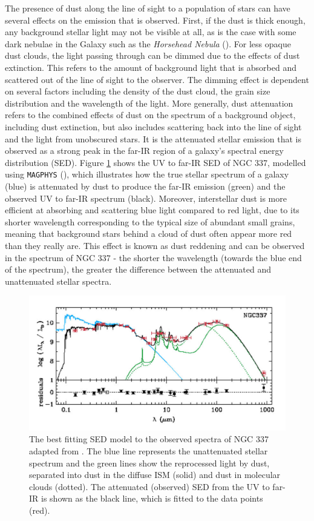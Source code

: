 The presence of dust along the line of sight to a population of stars can have several effects on the emission that is observed. First, if the dust is thick enough, any background stellar light may not be visible at all, as is the case with some dark nebulae in the Galaxy such as the \textit{Horsehead Nebula} (\citealt{Greenberg_2002}). For less opaque dust clouds, the light passing through can be dimmed due to the effects of dust extinction. This refers to the amount of background light that is absorbed and scattered out of the line of sight to the observer. The dimming effect is dependent on several factors including the density of the dust cloud, the grain size distribution and the wavelength of the light. More generally, dust attenuation refers to the combined effects of dust on the spectrum of a background object, including dust extinction, but also includes scattering back into the line of sight and the light from unobscured stars. It is the attenuated stellar emission that is observed as a strong peak in the far-IR region of a galaxy's spectral energy distribution (SED). Figure \ref{fig:unattenuated_attenuated_sed} shows the UV to far-IR SED of NGC 337, modelled using \texttt{MAGPHYS} (\citealt{daCunha_2008}), which illustrates how the true stellar spectrum of a galaxy (blue) is attenuated by dust to produce the far-IR emission (green) and the observed UV to far-IR spectrum (black). Moreover, interstellar dust is more efficient at absorbing and scattering blue light compared to red light, due to its shorter wavelength corresponding to the typical size of abundant small grains, meaning that background stars behind a cloud of dust often appear more red than they really are. This effect is known as dust reddening and can be observed in the spectrum of NGC 337 - the shorter the wavelength (towards the blue end of the spectrum), the greater the difference between the attenuated and unattenuated stellar spectra.

\begin{figure}
    \centering
	\includegraphics[width=0.9\columnwidth]{Figures/unattenuated_attenuated_sed.pdf}
	\caption[SED of NGC 337]{The best fitting SED model to the observed spectra of NGC 337 adapted from \citealt{daCunha_2008}. The blue line represents the unattenuated stellar spectrum and the green lines show the reprocessed light by dust, separated into dust in the diffuse ISM (solid) and dust in molecular clouds (dotted). The attenuated (observed) SED from the UV to far-IR is shown as the black line, which is fitted to the data points (red).}
	\label{fig:unattenuated_attenuated_sed}
\end{figure}

